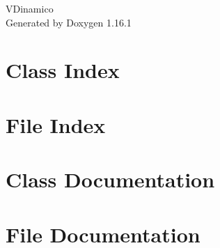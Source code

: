 \documentclass[twoside]{book}
\newcommand{\+}{\discretionary{\mbox{\scriptsize$\hookleftarrow$}}{}{}}
\newcommand{\clearemptydoublepage}{%
    \newpage{\pagestyle{empty}\cleardoublepage}%
  }
\begin{document}
  \raggedbottom
    \hypersetup{pageanchor=false,
                bookmarksnumbered=true,
                pdfencoding=unicode
               }
  \begin{titlepage}
  \vspace*{7cm}
  \begin{center}%
  {\Large VDinamico}\\
  \vspace*{1cm}
  {\large Generated by Doxygen 1.16.1}\\
  \end{center}
  \end{titlepage}
  \clearemptydoublepage
  \tableofcontents
  \clearemptydoublepage
  \hypersetup{pageanchor=true}
\chapter{Class Index}

\chapter{File Index}

\chapter{Class Documentation}



\chapter{File Documentation}



  \backmatter
  \newpage
  \clearemptydoublepage
  \printindex
\end{document}
